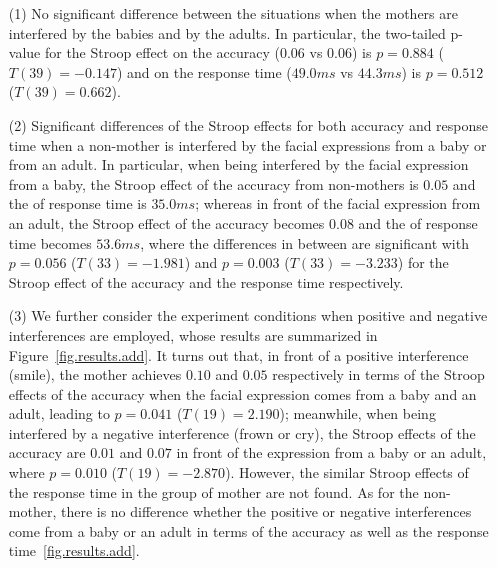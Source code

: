 \begin{itemize}
\item[(1)] 
No significant difference between the situations
when the mothers are interfered by the babies and
by the adults.
In particular,
the two-tailed p-value for the Stroop effect
on the accuracy ($0.06$ vs $0.06$) is 
$p=0.884$ ($T(39)=-0.147$) and on the response time
($49.0ms$ vs $44.3ms$)
is $p=0.512$ ($T(39)=0.662$).

\item[(2)] 
Significant differences of the Stroop effects
for both accuracy and response time when 
a non-mother is interfered by the facial expressions from 
a baby or from an adult. 
In particular, 
when being interfered by the facial expression from a baby,
the Stroop effect of the accuracy from non-mothers is $0.05$ and 
the of response time is $35.0ms$;
whereas in front of the facial expression from an adult,
the Stroop effect of the accuracy becomes $0.08$ and 
the of response time becomes $53.6ms$,
where the differences in between are significant 
with $p=0.056$ ($T(33)=-1.981$) and 
$p=0.003$ ($T(33)=-3.233$) for the Stroop effect of the accuracy and the response time respectively.

\item[(3)]
We further consider the experiment conditions
when positive and negative interferences
are employed, whose results are summarized 
in Figure~\ref{fig.results.add}.
It turns out that,
in front of a positive interference (smile),
the mother achieves $0.10$ and $0.05$ respectively in terms of the Stroop effects of the accuracy 
when the facial expression comes from a baby and an adult,
leading to $p=0.041$ ($T(19)=2.190$);
meanwhile, when being interfered by a negative interference 
(frown or cry),
the Stroop effects of the accuracy are $0.01$ and $0.07$ in front of 
the expression from a baby or an adult,
where $p=0.010$ ($T(19)= -2.870$). However, the similar Stroop effects of the response time in the group of mother are not found. As for the non-mother, there is no difference whether the positive or negative interferences come from a baby or an adult in terms of the accuracy as well as the response time~\ref{fig.results.add}.



\end{itemize}

